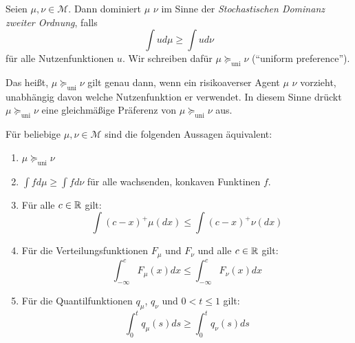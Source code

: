 \documentclass[a4paper,twoside,DIV15,BCOR12mm]{scrbook}
\newcommand{\cM}{\mathcal M}
\newcommand{\unisucceq}{\succeq_{\text{uni}}}
\begin{document}
\begin{definition}
Seien $\mu,\nu\in\cM$. Dann dominiert $\mu$ $\nu$ im Sinne der \emph{Stochastischen Dominanz zweiter Ordnung}, falls 
\[
\int u d\mu \ge \int u d\nu
\]
für alle Nutzenfunktionen $u$. Wir schreiben dafür $\mu \unisucceq \nu$ (“uniform preference”).
\end{definition}

Das heißt, $\mu \unisucceq \nu$ gilt genau dann, wenn ein risikoaverser Agent $\mu$ $\nu$ vorzieht, unabhängig davon welche Nutzenfunktion er verwendet. In diesem Sinne drückt $\mu\unisucceq \nu$ eine gleichmäßige Präferenz von $\mu\unisucceq\nu$ aus.

\begin{satz}
\label{satz:1.3.2}Für beliebige $\mu,\nu\in\cM$ sind die folgenden Aussagen äquivalent:
\begin{enumerate}
\item $\mu\unisucceq \nu$
\item $\int fd\mu \ge \int f d\nu$ für alle wachsenden, konkaven Funktinen $f$.
\item Für alle $c\in\mathbb{R}$ gilt:
\[
\int (c-x)^+\mu(dx) \le \int (c-x)^+\nu(dx)
\]
\item Für die Verteilungsfunktionen $F_\mu$ und $F_\nu$ und alle $c\in\mathbb{R}$ gilt:
\[
\int_{-\infty}^c F_{\mu}(x) dx \le \int_{-\infty}^c F_{\nu}(x) dx 
\]
\item Für die Quantilfunktionen $q_\mu$, $q_\nu$ und $0<t\le 1$ gilt:
\[
\int_0^t q_\mu(s)ds \ge \int_0^t q_\nu(s)ds
\]
\end{enumerate}
\end{satz}
\end{document}
